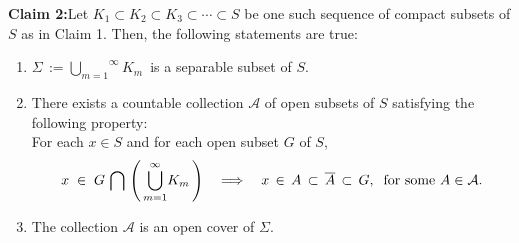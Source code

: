 \vskip 0.5cm
\begin{center}
\begin{minipage}{6.5in}
\textbf{Claim 2:}\quad Let  $K_{1} \subset K_{2} \subset K_{3} \subset \cdots \subset S$
be one such sequence of compact subsets of $S$ as in Claim 1.
Then, the following statements are true:
\begin{enumerate}
\item	$\Sigma \,:= \overset{\infty}{\underset{m=1}{\bigcup}}K_{m}$\, is a separable subset of $S$.
\item	There exists a countable collection $\mathcal{A}$ of open subsets of $S$ satisfying
		the following property: \\
		For each $x \in S$ and for each open subset $G$ of $S$,
		\begin{equation*}
		x \; \in \; G\,\bigcap\,\left(\,\overset{\infty}{\underset{m=1}{\bigcup}}K_{m}\,\right)
		\quad
		\Longrightarrow
		\quad
		x \,\in\, A \,\subset\, \overline{A} \,\subset\, G,
		\;\;\textnormal{for some $A \in \mathcal{A}$}.
		\end{equation*}
\item	The collection $\mathcal{A}$ is an open cover of $\Sigma$.
\end{enumerate}
\end{minipage}
\end{center}

